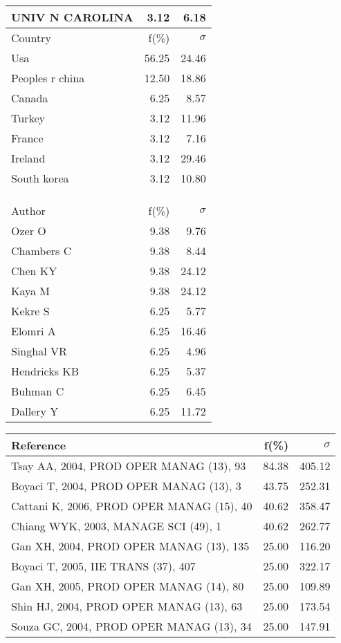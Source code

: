 \documentclass[a4paper,11pt]{report}
\begin{document}
\begin{landscape}
\begin{table}[!ht]
{\begin{tabular}{|l r r|}
UNIV N CAROLINA & 3.12 & 6.18\\
\hline
\hline
Country & f(\%) & $\sigma$\\
\hline
Usa & 56.25 & 24.46\\
Peoples r china & 12.50 & 18.86\\
Canada & 6.25 & 8.57\\
Turkey & 3.12 & 11.96\\
France & 3.12 & 7.16\\
Ireland & 3.12 & 29.46\\
South korea & 3.12 & 10.80\\
 &  & \\
 &  & \\
 &  & \\
\hline
\hline
Author & f(\%) & $\sigma$\\
\hline
Ozer O & 9.38 & 9.76\\
Chambers C & 9.38 & 8.44\\
Chen KY & 9.38 & 24.12\\
Kaya M & 9.38 & 24.12\\
Kekre S & 6.25 & 5.77\\
Elomri A & 6.25 & 16.46\\
Singhal VR & 6.25 & 4.96\\
Hendricks KB & 6.25 & 5.37\\
Buhman C & 6.25 & 6.45\\
Dallery Y & 6.25 & 11.72\\
\hline
\end{tabular}
}
{\scriptsize\begin{tabular}{|l r r|}
\hline
Reference & f(\%) & $\sigma$\\
\hline
Tsay AA, 2004, PROD OPER MANAG (13), 93 & 84.38 & 405.12\\
Boyaci T, 2004, PROD OPER MANAG (13), 3 & 43.75 & 252.31\\
Cattani K, 2006, PROD OPER MANAG (15), 40 & 40.62 & 358.47\\
Chiang WYK, 2003, MANAGE SCI (49), 1 & 40.62 & 262.77\\
Gan XH, 2004, PROD OPER MANAG (13), 135 & 25.00 & 116.20\\
Boyaci T, 2005, IIE TRANS (37), 407 & 25.00 & 322.17\\
Gan XH, 2005, PROD OPER MANAG (14), 80 & 25.00 & 109.89\\
Shin HJ, 2004, PROD OPER MANAG (13), 63 & 25.00 & 173.54\\
Souza GC, 2004, PROD OPER MANAG (13), 34 & 25.00 & 147.91\\

\end{tabular}}
\end{table}
\end{landscape}
\end{document}
